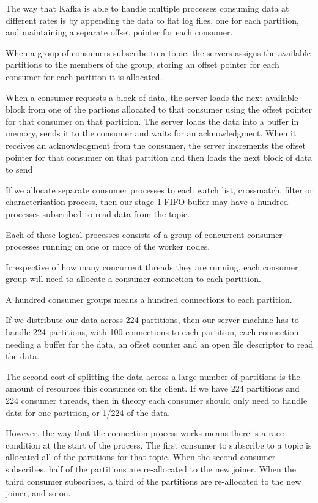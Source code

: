 \documentclass{article}
\newcommand{\crossmatch} {crossmatch\xspace}
\begin{document}
The way that Kafka is able to handle multiple processes consuming data at different rates is by appending the data to flat log files, one for each partition, and maintaining a separate offset pointer for each consumer.

When a group of consumers subscribe to a topic, the servers assigns the available partitions to the members of the group, storing an offset pointer for each consumer for each partiton it is allocated.

When a consumer requests a block of data, the server loads the next available block from one of the partions allocated to that consumer using the offset pointer for that consumer on that partition.
The server loads the data into a buffer in memory, sends it to the consumer and waits for an acknowledgment.
When it receives an acknowledgment from the consumer, the server increments the offset pointer for that consumer on that partition and then loads the next block of data to send

If we allocate separate consumer processes to each watch list, \crossmatch, filter or characterization process, then our stage 1 FIFO buffer may have a hundred processes subscribed to read data from the topic.

Each of these logical processes consists of a group of concurrent consumer processes running on one or more of the worker nodes.

Irrespective of how many concurrent threads they are running, each consumer group will need to allocate
a consumer connection to each partition.

A hundred consumer groups means a hundred connections to each partition.

If we distribute our data across 224 partitions, then our server machine has to handle 224 partitions, with 100 connections to each partition, each connection needing a buffer for the data, an offset counter and an open file descriptor to read the data.


The second cost of splitting the data across a large number of partitions is the amount of resources this consumes on the client.
If we have 224 partitions and 224 consumer threads, then in theory each consumer should only need to handle data for one partition, or 1/224 of the data.

However, the way that the connection process works means there is a race condition at the start of the process.
The first consumer to subscribe to a topic is allocated all of the partitions for that topic.
When the second consumer subscribes, half of the partitions are re-allocated to the new joiner.
When the third consumer subscribes, a third of the partitions are re-allocated to the new joiner, and so on.
\end{document}
